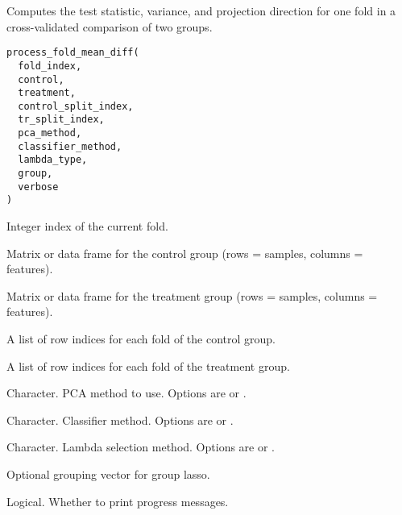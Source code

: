 \documentclass[a4paper]{book}
\begin{document}
%
\begin{Description}
Computes the test statistic, variance, and projection direction for one fold in a cross-validated comparison of two groups.
\end{Description}
%
\begin{Usage}
\begin{verbatim}
process_fold_mean_diff(
  fold_index,
  control,
  treatment,
  control_split_index,
  tr_split_index,
  pca_method,
  classifier_method,
  lambda_type,
  group,
  verbose
)
\end{verbatim}
\end{Usage}
%
\begin{Arguments}
\begin{ldescription}
\item[\code{fold\_index}] Integer index of the current fold.

\item[\code{control}] Matrix or data frame for the control group (rows = samples, columns = features).

\item[\code{treatment}] Matrix or data frame for the treatment group (rows = samples, columns = features).

\item[\code{control\_split\_index}] A list of row indices for each fold of the control group.

\item[\code{tr\_split\_index}] A list of row indices for each fold of the treatment group.

\item[\code{pca\_method}] Character. PCA method to use. Options are  or .

\item[\code{classifier\_method}] Character. Classifier method. Options are  or .

\item[\code{lambda\_type}] Character. Lambda selection method. Options are  or .

\item[\code{group}] Optional grouping vector for group lasso.

\item[\code{verbose}] Logical. Whether to print progress messages.
\end{ldescription}
\end{Arguments}
\end{document}
